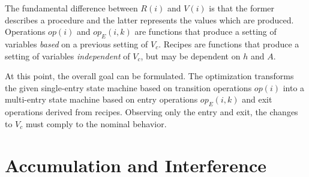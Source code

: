 \documentclass[12pt,a4paper]{scrartcl}
\begin{document}
The fundamental difference between $R(i)$ and $V(i)$ is that the former
describes a procedure and the latter represents the values which are produced.
Operations $op(i)$ and $op_E(i,k)$ are functions that produce a setting of
variables \textit{based} on a previous setting of $V_c$.  Recipes are functions
that produce a setting of variables \textit{independent} of $V_c$, but may be
dependent on $h$ and $A$.

At this point, the overall goal can be formulated. The optimization transforms
the given single-entry state machine based on transition operations $op(i)$
into a multi-entry state machine based on entry operations $op_E(i,k)$ and exit
operations derived from recipes. Observing only the entry and exit, the changes
to $V_c$ must comply to the nominal behavior. 

%
\section{Accumulation and Interference}
\end{document}
